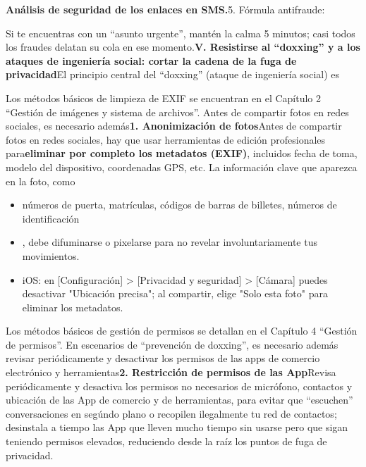 
\textbf{Análisis de seguridad de los enlaces en SMS.}5. Fórmula antifraude:


Si te encuentras con un “asunto urgente”, mantén la calma 5 minutos; casi todos los fraudes delatan su cola en ese momento.\textbf{V. Resistirse al “doxxing” y a los ataques de ingeniería social: cortar la cadena de la fuga de privacidad}El principio central del “doxxing” (ataque de ingeniería social) es


Los métodos básicos de limpieza de EXIF se encuentran en el Capítulo 2 “Gestión de imágenes y sistema de archivos”. Antes de compartir fotos en redes sociales, es necesario además\textbf{1. Anonimización de fotos}Antes de compartir fotos en redes sociales, hay que usar herramientas de edición profesionales para\textbf{eliminar por completo los metadatos (EXIF)}, incluidos fecha de toma, modelo del dispositivo, coordenadas GPS, etc. La información clave que aparezca en la foto, como

\begin{itemize}
  \item números de puerta, matrículas, códigos de barras de billetes, números de identificación
  \item , debe difuminarse o pixelarse para no revelar involuntariamente tus movimientos.
  \item iOS: en [Configuración] > [Privacidad y seguridad] > [Cámara] puedes desactivar "Ubicación precisa"; al compartir, elige "Solo esta foto" para eliminar los metadatos.
\end{itemize}


Los métodos básicos de gestión de permisos se detallan en el Capítulo 4 “Gestión de permisos”. En escenarios de “prevención de doxxing”, es necesario además revisar periódicamente y desactivar los permisos de las apps de comercio electrónico y herramientas\textbf{2. Restricción de permisos de las App}Revisa periódicamente y desactiva los permisos no necesarios de micrófono, contactos y ubicación de las App de comercio y de herramientas, para evitar que “escuchen” conversaciones en segúndo plano o recopilen ilegalmente tu red de contactos; desinstala a tiempo las App que lleven mucho tiempo sin usarse pero que sigan teniendo permisos elevados, reduciendo desde la raíz los puntos de fuga de privacidad.

